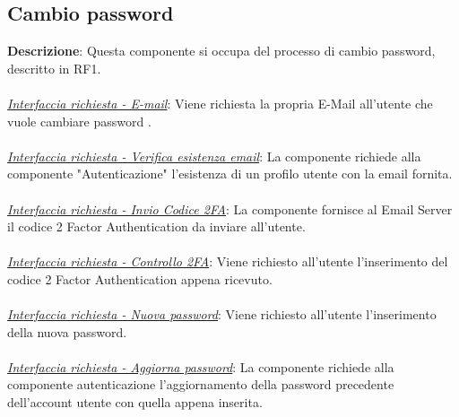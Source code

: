 \documentclass{report}
\begin{document}
\subsection*{Cambio password}
\textbf{Descrizione}: Questa componente si occupa del processo di cambio password, descritto in RF1.\\ \\ 
\uline{\textit{Interfaccia richiesta - E-mail}}: 
Viene richiesta la propria E-Mail all'utente che vuole cambiare password .\\ \\
\uline{\textit{Interfaccia richiesta - Verifica esistenza email}}: 
La componente richiede alla componente "Autenticazione" l'esistenza di un profilo utente con la email fornita.\\ \\ 
\uline{\textit{Interfaccia richiesta - Invio Codice 2FA}}: 
La componente fornisce al Email Server il codice 2 Factor Authentication da inviare all'utente.\\ \\ 
\uline{\textit{Interfaccia richiesta - Controllo 2FA}}:
Viene richiesto all'utente l'inserimento del codice 2 Factor Authentication appena ricevuto.\\ \\ 
\uline{\textit{Interfaccia richiesta - Nuova password}}: 
Viene richiesto all'utente l'inserimento della nuova password.\\ \\
\uline{\textit{Interfaccia richiesta - Aggiorna password}}: 
La componente richiede alla componente autenticazione l'aggiornamento della password precedente dell'account utente con quella appena inserita.
\end{document}
